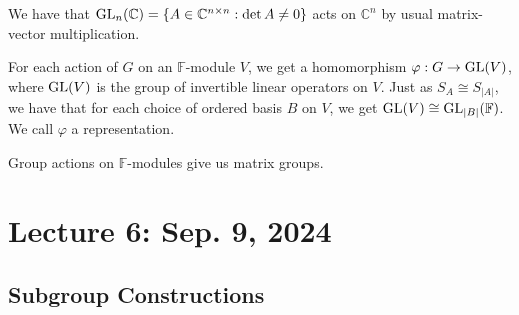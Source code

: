         \begin{example}
            We have that \(\operatorname{GL}_n(\mathbb{C})=\{A\in\mathbb{C}^{n\times n}: \det A\neq 0\}\) acts on \(\mathbb{C}^n\) by usual matrix-vector multiplication.
        \end{example}
        \begin{remark*}
            For each action of \(G\) on an \(\mathbb{F}\)-module \(V\), we get a homomorphism \(\varphi:G\to\operatorname{GL}(V)\), where \(\operatorname{GL}(V)\) is the group of invertible linear operators on \(V\). Just as \(S_A\cong S_{|A|}\), we have that for each choice of ordered basis \(B\) on \(V\), we get \(\operatorname{GL}(V)\cong \operatorname{GL}_{|B|}(\mathbb{F})\). We call \(\varphi\) a representation.
        \end{remark*}
        \begin{remark*}
            Group actions on \(\mathbb{F}\)-modules give us matrix groups.
        \end{remark*}

        \pagebreak

\section{Lecture 6: Sep. 9, 2024}

    \subsection{Subgroup Constructions}

